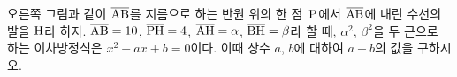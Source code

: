 \noindent\begin{minipage}[t]{0.58\linewidth}\vspace{0pt}\raggedright 오른쪽 그림과 같이 $\overline{\mathrm{AB}}$를 지름으로 하는 반원 위의 한 점~$\mathrm{P}$에서 $\overline{\mathrm{AB}}$에 내린 수선의 발을 $\mathrm{H}$라 하자. $\overline{\mathrm{AB}}=10$, $\overline{\mathrm{PH}}=4$, $\overline{\mathrm{AH}}=\alpha$, $\overline{\mathrm{BH}}=\beta$라 할 때, $\alpha^2$, $\beta^2$을 두 근으로 하는 이차방정식은 $x^2+ax+b=0$이다. 이때 상수 $a$, $b$에 대하여 $a+b$의 값을 구하시오.\end{minipage}\hfill\begin{minipage}[t]{0.4\linewidth}\vspace{0pt}\centering \resizebox{\ifdim\width>\linewidth\linewidth\else\width\fi}{!}{}\end{minipage}\par
